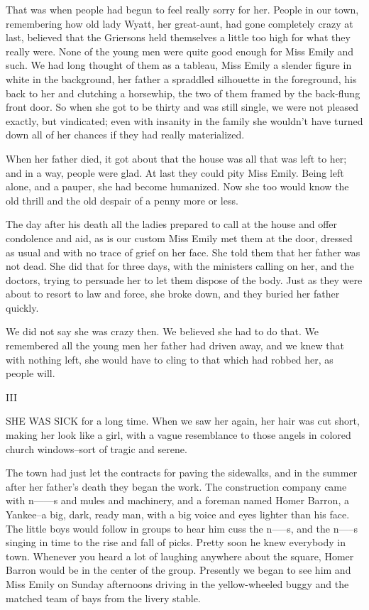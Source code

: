 \documentclass[10pt,a4paper]{article}
\begin{document}
That was when people had begun to feel really sorry for her. People in our town, remembering how old lady Wyatt, her great-aunt, had gone completely crazy at last, believed that the Griersons held themselves a little too high for what they really were. None of the young men were quite good enough for Miss Emily and such. We had long thought of them as a tableau, Miss Emily a slender figure in white in the background, her father a spraddled silhouette in the foreground, his back to her and clutching a horsewhip, the two of them framed by the back-flung front door. So when she got to be thirty and was still single, we were not pleased exactly, but vindicated; even with insanity in the family she wouldn't have turned down all of her chances if they had really materialized.

When her father died, it got about that the house was all that was left to her; and in a way, people were glad. At last they could pity Miss Emily. Being left alone, and a pauper, she had become humanized. Now she too would know the old thrill and the old despair of a penny more or less.

The day after his death all the ladies prepared to call at the house and offer condolence and aid, as is our custom Miss Emily met them at the door, dressed as usual and with no trace of grief on her face. She told them that her father was not dead. She did that for three days, with the ministers calling on her, and the doctors, trying to persuade her to let them dispose of the body. Just as they were about to resort to law and force, she broke down, and they buried her father quickly.

We did not say she was crazy then. We believed she had to do that. We remembered all the young men her father had driven away, and we knew that with nothing left, she would have to cling to that which had robbed her, as people will.

III

SHE WAS SICK for a long time. When we saw her again, her hair was cut short, making her look like a girl, with a vague resemblance to those angels in colored church windows--sort of tragic and serene.

The town had just let the contracts for paving the sidewalks, and in the summer after her father's death they began the work. The construction company came with n------s and mules and machinery, and a foreman named Homer Barron, a Yankee--a big, dark, ready man, with a big voice and eyes lighter than his face. The little boys would follow in groups to hear him cuss the n-----s, and the n-----s singing in time to the rise and fall of picks. Pretty soon he knew everybody in town. Whenever you heard a lot of laughing anywhere about the square, Homer Barron would be in the center of the group. Presently we began to see him and Miss Emily on Sunday afternoons driving in the yellow-wheeled buggy and the matched team of bays from the livery stable.
\end{document}
